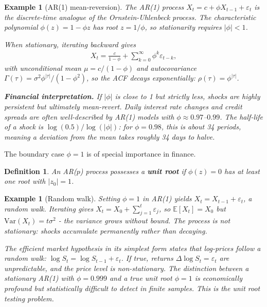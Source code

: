 \documentclass{report}
\theoremstyle{spacedplain}
\theoremstyle{spaceddefinition}
\newtheorem{definition}[theorem]{Definition}
\newtheorem{example}[theorem]{Example}
\theoremstyle{spacedremark}
\begin{document}
\begin{example}[AR(1) mean-reversion]
The AR(1) process $X_t = c + \phi X_{t-1} + \varepsilon_t$ is the discrete-time analogue of the Ornstein-Uhlenbeck process. The characteristic polynomial $\phi(z) = 1 - \phi z$ has root $z = 1/\phi$, so stationarity requires $|\phi| < 1$.

When stationary, iterating backward gives
\begin{align}
    X_t = \frac{c}{1-\phi} + \sum_{k=0}^{\infty} \phi^k \varepsilon_{t-k},
\end{align}
with unconditional mean $\mu = c/(1-\phi)$ and autocovariance $\Gamma(\tau) = \sigma^2 \phi^{|\tau|}/(1-\phi^2)$, so the ACF decays exponentially: $\rho(\tau) = \phi^{|\tau|}$.

\textbf{Financial interpretation.} If $|\phi|$ is close to 1 but strictly less, shocks are highly persistent but ultimately mean-revert. Daily interest rate changes and credit spreads are often well-described by AR(1) models with $\phi \approx 0.97$--$0.99$. The half-life of a shock is $\log(0.5)/\log(|\phi|)$: for $\phi = 0.98$, this is about 34 periods, meaning a deviation from the mean takes roughly 34 days to halve.
\end{example}

The boundary case $\phi = 1$ is of special importance in finance.

\begin{definition}
An AR($p$) process possesses a \textbf{unit root} if $\phi(z) = 0$ has at least one root with $|z_0| = 1$.
\end{definition}

\begin{example}[Random walk]
Setting $\phi = 1$ in AR(1) yields $X_t = X_{t-1} + \varepsilon_t$, a random walk. Iterating gives $X_t = X_0 + \sum_{j=1}^t \varepsilon_j$, so $\mathbb{E}[X_t] = X_0$ but $\text{Var}(X_t) = t\sigma^2$ - the variance grows without bound. The process is not stationary: shocks accumulate permanently rather than decaying.

The efficient market hypothesis in its simplest form states that log-prices follow a random walk: $\log S_t = \log S_{t-1} + \varepsilon_t$. If true, returns $\Delta \log S_t = \varepsilon_t$ are unpredictable, and the price level is non-stationary. The distinction between a stationary AR(1) with $\phi = 0.999$ and a true unit root $\phi = 1$ is economically profound but statistically difficult to detect in finite samples. This is the unit root testing problem.
\end{example}
\end{document}
